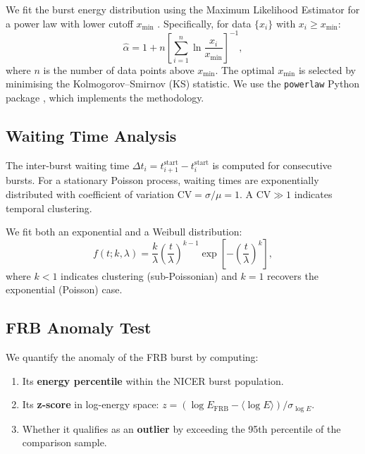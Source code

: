 \documentclass[12pt]{article}
\begin{document}
We fit the burst energy distribution using the Maximum Likelihood
Estimator for a power law with lower cutoff $x_{\min}$
\citep{clauset2009}. Specifically, for data $\{x_i\}$ with $x_i \geq x_{\min}$:
\begin{equation}
    \hat{\alpha} = 1 + n\left[\sum_{i=1}^{n} \ln\frac{x_i}{x_{\min}}\right]^{-1},
\end{equation}
where $n$ is the number of data points above $x_{\min}$. The optimal
$x_{\min}$ is selected by minimising the Kolmogorov--Smirnov (KS)
statistic. We use the \texttt{powerlaw} Python package
\citep{alstott2014}, which implements the \citet{clauset2009} methodology.

\subsection{Waiting Time Analysis}

The inter-burst waiting time $\Delta t_i = t_{i+1}^{\mathrm{start}} -
t_i^{\mathrm{start}}$ is computed for consecutive bursts. For a
stationary Poisson process, waiting times are exponentially distributed
with coefficient of variation $\mathrm{CV} = \sigma/\mu = 1$.
A $\mathrm{CV} \gg 1$ indicates temporal clustering.

We fit both an exponential and a Weibull distribution:
\begin{equation}
    f(t; k, \lambda) = \frac{k}{\lambda}\left(\frac{t}{\lambda}\right)^{k-1}
    \exp\!\left[-\left(\frac{t}{\lambda}\right)^{k}\right],
\end{equation}
where $k < 1$ indicates clustering (sub-Poissonian) and $k = 1$ recovers
the exponential (Poisson) case.

\subsection{FRB Anomaly Test}

We quantify the anomaly of the FRB burst by computing:
\begin{enumerate}
    \item Its \textbf{energy percentile} within the NICER burst population.
    \item Its \textbf{z-score} in log-energy space:
        $z = (\log E_{\mathrm{FRB}} - \langle\log E\rangle) / \sigma_{\log E}$.
    \item Whether it qualifies as an \textbf{outlier} by exceeding the
          95th percentile of the comparison sample.
\end{enumerate}
\end{document}
